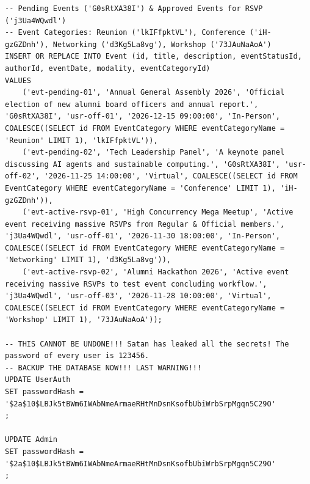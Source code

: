 \documentclass[11pt,letterpaper]{article}
\begin{document}
\begin{lstlisting}
-- Pending Events ('G0sRtXA38I') & Approved Events for RSVP ('j3Ua4WQwdl')
-- Event Categories: Reunion ('lkIFfpktVL'), Conference ('iH-gzGZDnh'), Networking ('d3Kg5La8vg'), Workshop ('73JAuNaAoA')
INSERT OR REPLACE INTO Event (id, title, description, eventStatusId, authorId, eventDate, modality, eventCategoryId)
VALUES 
    ('evt-pending-01', 'Annual General Assembly 2026', 'Official election of new alumni board officers and annual report.', 'G0sRtXA38I', 'usr-off-01', '2026-12-15 09:00:00', 'In-Person', COALESCE((SELECT id FROM EventCategory WHERE eventCategoryName = 'Reunion' LIMIT 1), 'lkIFfpktVL')),
    ('evt-pending-02', 'Tech Leadership Panel', 'A keynote panel discussing AI agents and sustainable computing.', 'G0sRtXA38I', 'usr-off-02', '2026-11-25 14:00:00', 'Virtual', COALESCE((SELECT id FROM EventCategory WHERE eventCategoryName = 'Conference' LIMIT 1), 'iH-gzGZDnh')),
    ('evt-active-rsvp-01', 'High Concurrency Mega Meetup', 'Active event receiving massive RSVPs from Regular & Official members.', 'j3Ua4WQwdl', 'usr-off-01', '2026-11-30 18:00:00', 'In-Person', COALESCE((SELECT id FROM EventCategory WHERE eventCategoryName = 'Networking' LIMIT 1), 'd3Kg5La8vg')),
    ('evt-active-rsvp-02', 'Alumni Hackathon 2026', 'Active event receiving massive RSVPs to test event concluding workflow.', 'j3Ua4WQwdl', 'usr-off-03', '2026-11-28 10:00:00', 'Virtual', COALESCE((SELECT id FROM EventCategory WHERE eventCategoryName = 'Workshop' LIMIT 1), '73JAuNaAoA'));

-- THIS CANNOT BE UNDONE!!! Satan has leaked all the secrets! The password of every user is 123456.
-- BACKUP THE DATABASE NOW!!! LAST WARNING!!!
UPDATE UserAuth
SET passwordHash = '$2a$10$LBJk5tBWm6IWAbNmeArmaeRHtMnDsnKsofbUbiWrbSrpMgqn5C29O'
;

UPDATE Admin
SET passwordHash = '$2a$10$LBJk5tBWm6IWAbNmeArmaeRHtMnDsnKsofbUbiWrbSrpMgqn5C29O'
;
\end{lstlisting}
\end{document}
